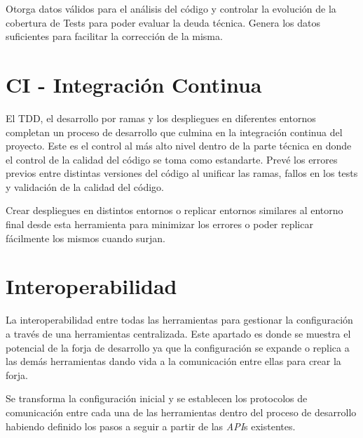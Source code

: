 \par Otorga datos válidos para el análisis del código y controlar la evolución de la cobertura de Tests para poder evaluar la deuda técnica. Genera los datos suficientes para facilitar la corrección de la misma.


\section{CI - Integración Continua}
\label{sec:integracion-continua}

\par El TDD, el desarrollo por ramas y los despliegues en diferentes entornos completan un proceso de desarrollo que culmina en la integración continua del proyecto. Este es el control al más alto nivel dentro de la parte técnica en donde el control de la calidad del código se toma como estandarte. Prevé los errores previos entre distintas versiones del código al unificar las ramas, fallos en los tests y validación de la calidad del código.

\par Crear despliegues en distintos entornos o replicar entornos similares al entorno final desde esta herramienta para minimizar los errores o poder replicar fácilmente los mismos cuando surjan.


\section{Interoperabilidad}
\label{sec:interoperabilidad}

\par La interoperabilidad entre todas las herramientas para gestionar la configuración a través de una herramientas centralizada. Este apartado es donde se muestra el potencial de la forja de desarrollo ya que la configuración se expande o replica a las demás herramientas dando vida a la comunicación entre ellas para crear la forja.

\par Se transforma la configuración inicial y se establecen los protocolos de comunicación entre cada una de las herramientas dentro del proceso de desarrollo habiendo definido los pasos a seguir a partir de las \emph{API}s existentes.

